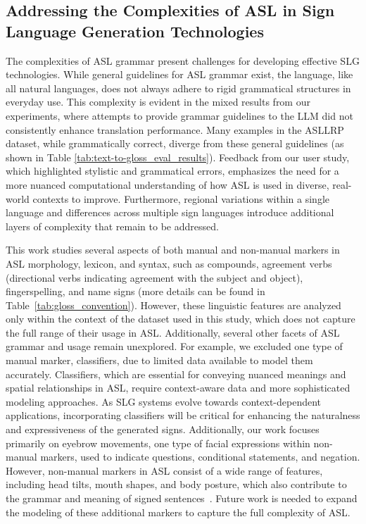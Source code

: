 \subsection{Addressing the Complexities of ASL in Sign Language Generation Technologies}

The complexities of ASL grammar present challenges for developing effective SLG technologies. While general guidelines for ASL grammar exist, the language, like all natural languages, does not always adhere to rigid grammatical structures in everyday use. This complexity is evident in the mixed results from our experiments, where attempts to provide grammar guidelines to the LLM did not consistently enhance translation performance. Many examples in the ASLLRP dataset, while grammatically correct, diverge from these general guidelines (as shown in Table \ref{tab:text-to-gloss_eval_results}). Feedback from our user study, which highlighted stylistic and grammatical errors, emphasizes the need for a more nuanced computational understanding of how ASL is used in diverse, real-world contexts to improve. Furthermore, regional variations within a single language and differences across multiple sign languages introduce additional layers of complexity that remain to be addressed. 
 
This work studies several aspects of both manual and non-manual markers in ASL morphology, lexicon, and syntax, such as compounds, agreement verbs (directional verbs indicating agreement with the subject and object), fingerspelling, and name signs (more details can be found in Table~\ref{tab:gloss_convention}). However, these linguistic features are analyzed only within the context of the dataset used in this study, which does not capture the full range of their usage in ASL. Additionally, several other facets of ASL grammar and usage remain unexplored. For example, we excluded one type of manual marker, classifiers, due to limited data available to model them accurately. Classifiers, which are essential for conveying nuanced meanings and spatial relationships in ASL, require context-aware data and more sophisticated modeling approaches. As SLG systems evolve towards context-dependent applications, incorporating classifiers will be critical for enhancing the naturalness and expressiveness of the generated signs. Additionally, our work focuses primarily on eyebrow movements, one type of facial expressions within non-manual markers, used to indicate questions, conditional statements, and negation. However, non-manual markers in ASL consist of a wide range of features, including head tilts, mouth shapes, and body posture, which also contribute to the grammar and meaning of signed sentences~\cite{Stokoe1961SignLS,klima1979signs,brentari2002prosody}. Future work is needed to expand the modeling of these additional markers to capture the full complexity of ASL.

